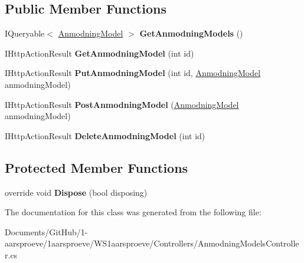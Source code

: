\subsection*{Public Member Functions}
\begin{DoxyCompactItemize}
\item 
\hypertarget{class_w_s1aarsproeve_1_1_controllers_1_1_anmodning_models_controller_a48f3f33b148fdd448b6ff590b4fc98a6}{}I\+Queryable$<$ \hyperlink{class_w_s1aarsproeve_1_1_anmodning_model}{Anmodning\+Model} $>$ {\bfseries Get\+Anmodning\+Models} ()\label{class_w_s1aarsproeve_1_1_controllers_1_1_anmodning_models_controller_a48f3f33b148fdd448b6ff590b4fc98a6}

\item 
\hypertarget{class_w_s1aarsproeve_1_1_controllers_1_1_anmodning_models_controller_a266dc5270c54288c1ad248183f61e055}{}I\+Http\+Action\+Result {\bfseries Get\+Anmodning\+Model} (int id)\label{class_w_s1aarsproeve_1_1_controllers_1_1_anmodning_models_controller_a266dc5270c54288c1ad248183f61e055}

\item 
\hypertarget{class_w_s1aarsproeve_1_1_controllers_1_1_anmodning_models_controller_af5791a62c2243237aa617522dcbb462a}{}I\+Http\+Action\+Result {\bfseries Put\+Anmodning\+Model} (int id, \hyperlink{class_w_s1aarsproeve_1_1_anmodning_model}{Anmodning\+Model} anmodning\+Model)\label{class_w_s1aarsproeve_1_1_controllers_1_1_anmodning_models_controller_af5791a62c2243237aa617522dcbb462a}

\item 
\hypertarget{class_w_s1aarsproeve_1_1_controllers_1_1_anmodning_models_controller_ae188e44ff37dd9f38da73b68e7ac6e9e}{}I\+Http\+Action\+Result {\bfseries Post\+Anmodning\+Model} (\hyperlink{class_w_s1aarsproeve_1_1_anmodning_model}{Anmodning\+Model} anmodning\+Model)\label{class_w_s1aarsproeve_1_1_controllers_1_1_anmodning_models_controller_ae188e44ff37dd9f38da73b68e7ac6e9e}

\item 
\hypertarget{class_w_s1aarsproeve_1_1_controllers_1_1_anmodning_models_controller_a3e2657a3403777d413bea3c97fad36f0}{}I\+Http\+Action\+Result {\bfseries Delete\+Anmodning\+Model} (int id)\label{class_w_s1aarsproeve_1_1_controllers_1_1_anmodning_models_controller_a3e2657a3403777d413bea3c97fad36f0}

\end{DoxyCompactItemize}
\subsection*{Protected Member Functions}
\begin{DoxyCompactItemize}
\item 
\hypertarget{class_w_s1aarsproeve_1_1_controllers_1_1_anmodning_models_controller_ad793684f6ad7e38a4ebfb56286e290dc}{}override void {\bfseries Dispose} (bool disposing)\label{class_w_s1aarsproeve_1_1_controllers_1_1_anmodning_models_controller_ad793684f6ad7e38a4ebfb56286e290dc}

\end{DoxyCompactItemize}


The documentation for this class was generated from the following file\+:\begin{DoxyCompactItemize}
\item 
Documents/\+Git\+Hub/1-\/aarsproeve/1aarsproeve/\+W\+S1aarsproeve/\+Controllers/Anmodning\+Models\+Controller.\+cs\end{DoxyCompactItemize}
